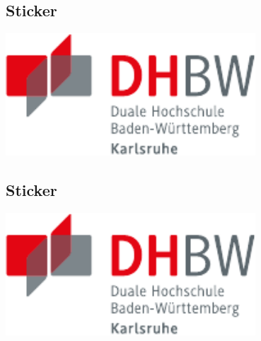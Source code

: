 \subsection{Sticker}
\begin{frame}{\subsecname}

  \begin{sticker}[0]
    \includegraphics[width=0.7\textwidth]{DHBW.pdf}
  \end{sticker}

\end{frame}

\subsection{Sticker}
\begin{frame}{\subsecname}

  \begin{sticker}[-1]
    \includegraphics[width=0.7\textwidth]{DHBW.pdf}
  \end{sticker}

\end{frame}
